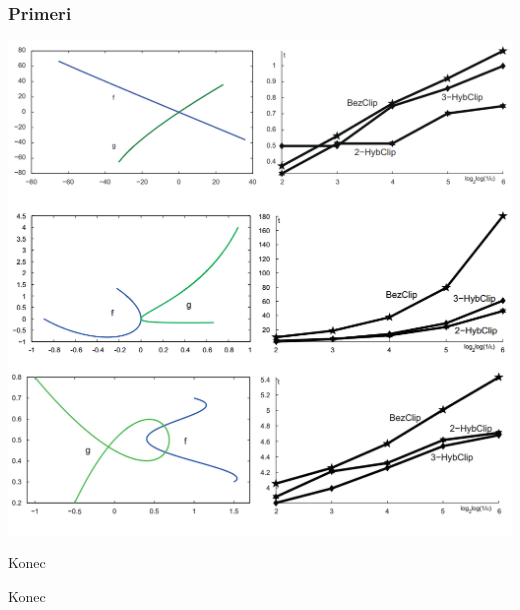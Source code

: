 \documentclass[unknownkeysallowed]{beamer}
\begin{document}
\begin{frame}
\frametitle{Primeri}
\center
\includegraphics[width=0.6\linewidth,frame]{primeri}
\end{frame}


\begin{frame}{Konec}
\Huge{\centerline{Konec}}
\end{frame}

\end{document}

